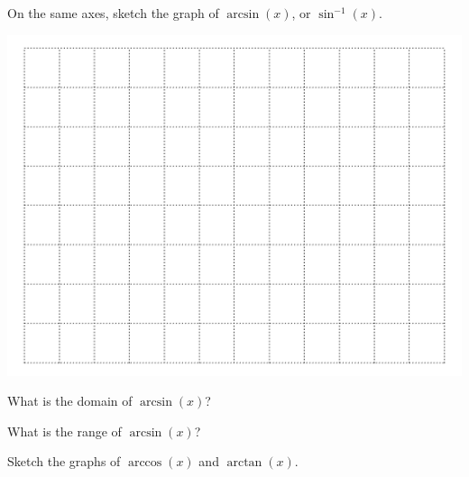  On the same axes, sketch the graph of $\arcsin(x)$, or $\sin^{-1}(x)$.

 \newpage
 \includegraphics[width=0.5\linewidth]{graphics/empty_graph_wide_12}

 \problem What is the domain of $\arcsin(x)$?  \vspace{1in}

   What is the range of $\arcsin(x)$?
 \vspace{1in}

\newpage

\problem Sketch the graphs of $\arccos(x)$ and $\arctan(x)$. \\[2ex]

